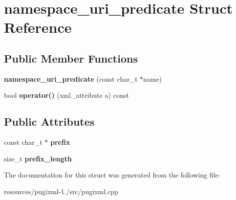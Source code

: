 \hypertarget{structnamespace__uri__predicate}{\section{namespace\+\_\+uri\+\_\+predicate Struct Reference}
\label{structnamespace__uri__predicate}
}
\subsection*{Public Member Functions}
\begin{DoxyCompactItemize}
\item 
\hypertarget{structnamespace__uri__predicate_a25bef9c1e12b0fdc908275ae7ab7c202}{{\bfseries namespace\+\_\+uri\+\_\+predicate} (const char\+\_\+t $\ast$name)}\label{structnamespace__uri__predicate_a25bef9c1e12b0fdc908275ae7ab7c202}

\item 
\hypertarget{structnamespace__uri__predicate_a9b1508940726f332b8a6c61a1d800ade}{bool {\bfseries operator()} (xml\+\_\+attribute a) const }\label{structnamespace__uri__predicate_a9b1508940726f332b8a6c61a1d800ade}

\end{DoxyCompactItemize}
\subsection*{Public Attributes}
\begin{DoxyCompactItemize}
\item 
\hypertarget{structnamespace__uri__predicate_a80a2c051b9e57b8895c28d8fcc32e051}{const char\+\_\+t $\ast$ {\bfseries prefix}}\label{structnamespace__uri__predicate_a80a2c051b9e57b8895c28d8fcc32e051}

\item 
\hypertarget{structnamespace__uri__predicate_aa48279192e8d48b9c798f5485a2a9170}{size\+\_\+t {\bfseries prefix\+\_\+length}}\label{structnamespace__uri__predicate_aa48279192e8d48b9c798f5485a2a9170}

\end{DoxyCompactItemize}


The documentation for this struct was generated from the following file\+:\begin{DoxyCompactItemize}
\item 
resources/pugixml-\/1./src/pugixml.\+cpp\end{DoxyCompactItemize}
